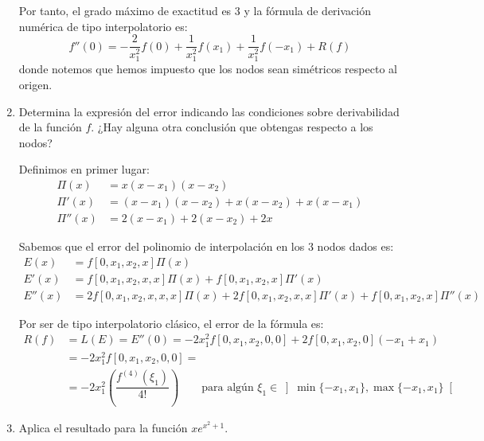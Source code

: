 \begin{ejercicio}
\begin{enumerate}
        Por tanto, el grado máximo de exactitud es $3$ y la fórmula de derivación numérica de tipo interpolatorio es:
        \begin{equation*}
            f''(0) = -\dfrac{2}{x_1^2}f(0) + \dfrac{1}{x_1^2}f(x_1) + \dfrac{1}{x_1^2}f(-x_1) + R(f)
        \end{equation*}
        donde notemos que hemos impuesto que los nodos sean simétricos respecto al origen.

        \item Determina la expresión del error indicando las condiciones sobre derivabilidad de la función $f$. ¿Hay alguna otra conclusión que obtengas respecto a los nodos?
        
        Definimos en primer lugar:
        \begin{align*}
            \Pi(x) &= x(x-x_1)(x-x_2)\\
            \Pi'(x) &= (x-x_1)(x-x_2) + x(x-x_2) + x(x-x_1)\\
            \Pi''(x) &= 2(x-x_1) + 2(x-x_2) + 2x
        \end{align*}

        Sabemos que el error del polinomio de interpolación en los $3$ nodos dados es:
        \begin{align*}
            E(x) &= f[0, x_1, x_2, x]\Pi(x)\\
            E'(x) &= f[0, x_1, x_2, x, x]\Pi(x) + f[0, x_1, x_2, x]\Pi'(x)\\
            E''(x) &= 2f[0, x_1, x_2, x, x, x]\Pi(x) + 2f[0, x_1, x_2, x, x]\Pi'(x) + f[0, x_1, x_2, x]\Pi''(x)
        \end{align*}

        Por ser de tipo interpolatorio clásico, el error de la fórmula es:
        \begin{align*}
            R(f) &= L(E) = E''(0) = -2x_1^2f[0, x_1, x_2, 0, 0]+2f[0, x_1, x_2, 0]\left(-x_1+x_1\right)\\
            &= -2x_1^2f[0, x_1, x_2, 0, 0]=\\&= -2x_1^2\left(\dfrac{f^{(4)}(\xi_1)}{4!}\right)\qquad \text{para algún }\xi_1\in\left]\min\{-x_1,x_1\},\max\{-x_1,x_1\}\right[
        \end{align*}

    
        
        \item Aplica el resultado para la función $x e^{x^2 + 1}$.
        
        
    \end{enumerate}
\end{ejercicio}

